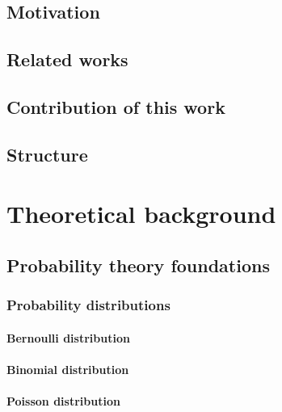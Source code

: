 \documentclass[english,master,unicode]{ctufit-thesis}
\theoremstyle{plain}
\theoremstyle{definition}
\theoremstyle{remark}
\numberwithin{theorem}{chapter}
\begin{document}
\section*{Motivation}
\section*{Related works}
\section*{Contribution of this work}
\section*{Structure}

\chapter{Theoretical background}\label{ch:theory}
    
    \section{Probability theory foundations}\label{sec:prob-foundations}
        
        \subsection{Probability distributions}\label{sec:prob-distributions}
            
            \subsubsection{Bernoulli distribution}\label{sec:bernoulli-distribution}
                
            \subsubsection{Binomial distribution}\label{sec:binomial-distribution}
                
            \subsubsection{Poisson distribution}\label{sec:poisson-distribution}
                
\end{document}

